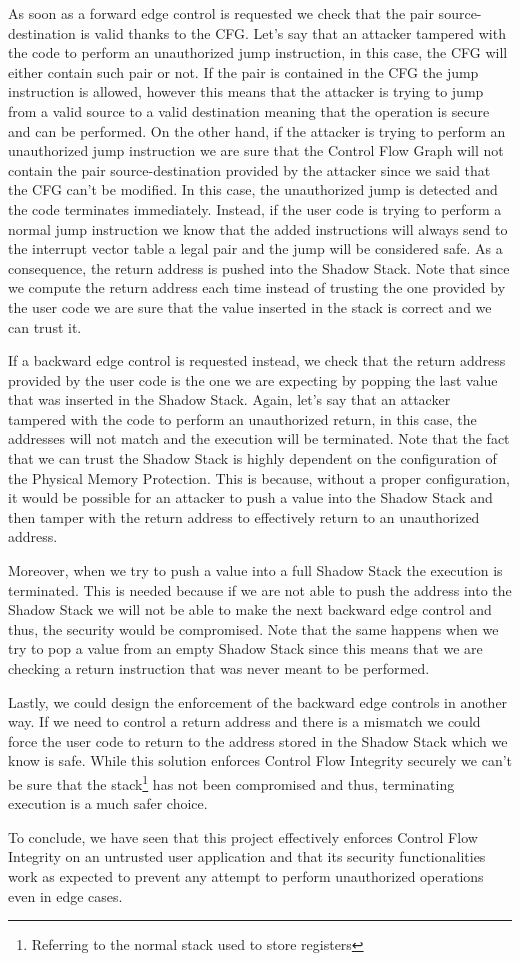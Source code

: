 As soon as a forward edge control is requested we check that the pair source-destination
is valid thanks to the CFG. Let's say that an attacker tampered with the code to
perform an unauthorized jump instruction, in this case, the CFG will either contain
such pair or not. If the pair is contained in the CFG the jump instruction is
allowed, however this means that the attacker is trying to jump from a valid source
to a valid destination meaning that the operation is secure and can be performed.
On the other hand, if the attacker is trying to perform an unauthorized jump instruction
we are sure that the Control Flow Graph will not contain the pair source-destination
provided by the attacker since we said that the CFG can't be modified. In this
case, the unauthorized jump is detected and the code terminates immediately.
Instead, if the user code is trying to perform a normal jump instruction we know
that the added instructions will always send to the interrupt vector table a legal
pair and the jump will be considered safe. As a consequence, the return address is
pushed into the Shadow Stack. Note that since we compute the return address each
time instead of trusting the one provided by the user code we are sure that the
value inserted in the stack is correct and we can trust it.

If a backward edge control is requested instead, we check that the return address
provided by the user code is the one we are expecting by popping the last value that
was inserted in the Shadow Stack. Again, let's say that an attacker tampered with
the code to perform an unauthorized return, in this case, the addresses will not
match and the execution will be terminated. Note that the fact that we can trust
the Shadow Stack is highly dependent on the configuration of the Physical Memory
Protection. This is because, without a proper configuration, it would be possible
for an attacker to push a value into the Shadow Stack and then tamper with the return
address to effectively return to an unauthorized address.

Moreover, when we try to push a value into a full Shadow Stack the execution is
terminated. This is needed because if we are not able to push the address into the
Shadow Stack we will not be able to make the next backward edge control and thus,
the security would be compromised. Note that the same happens when we try to pop
a value from an empty Shadow Stack since this means that we are checking a return
instruction that was never meant to be performed.

Lastly, we could design the enforcement of the backward edge controls in another
way. If we need to control a return address and there is a mismatch we could force
the user code to return to the address stored in the Shadow Stack which we know is
safe. While this solution enforces Control Flow Integrity securely we can't be
sure that the stack\footnote{Referring to the normal stack used to store
registers} has not been compromised and thus, terminating execution is a much
safer choice.

To conclude, we have seen that this project effectively enforces Control Flow Integrity
on an untrusted user application and that its security functionalities work as expected
to prevent any attempt to perform unauthorized operations even in edge cases.